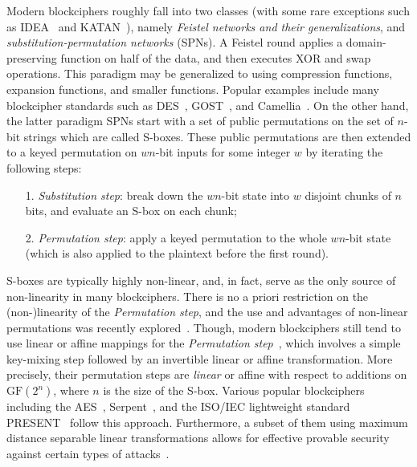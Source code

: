 \documentclass[journal=tosc,final,nohyperref]{iacrtrans}
\begin{document}
Modern blockciphers roughly fall into two classes (with some rare exceptions such as IDEA~\cite{EC:LaiMas90} and KATAN~\cite{CHES:DeCDunKne09}), namely {\it Feistel networks and their generalizations}, and {\it substitution-permutation networks} (SPNs). A Feistel round applies a domain-preserving function on half of the data, and then executes XOR and swap operations. This paradigm may be generalized to using compression functions, expansion functions, and smaller functions. Popular examples include many blockcipher standards such as DES~\cite{DESDesign}, GOST~\cite{GOSTDesign}, and Camellia~\cite{ISOIEC-18033-3:2010}. On the other hand, the latter paradigm SPNs start with a set of public permutations on the set of $n$-bit strings which are called S-boxes. These public permutations are then extended to a keyed permutation on $wn$-bit inputs for some integer $w$ by iterating the following steps:
\begin{enumerate}
	\item[1.] {\it Substitution step}: break down the $wn$-bit state into $w$ disjoint chunks of $n$ bits, and evaluate an S-box on each chunk;
	\item[2.] {\it Permutation step}: apply a keyed permutation to the whole $wn$-bit state (which is also applied to the plaintext before the first round).
\end{enumerate}
%
S-boxes are typically highly non-linear, and, in fact, serve as the only source of non-linearity in many blockciphers. There is no a priori restriction on the (non-)linearity of the {\it Permutation step}, and the use and advantages of non-linear permutations was recently explored~\cite{DBLP:journals/dcc/LiuRL18}. Though, modern blockciphers still tend to use linear or affine mappings for the {\it Permutation step}~\cite{DBLP:reference/crypt/Biryukov11aa}, which involves a simple key-mixing step followed
by an invertible linear or affine transformation. More precisely, their permutation steps are {\it linear} or affine with respect to additions on $\text{GF}(2^n)$, where $n$ is the size of the S-box. Various popular blockciphers including the AES~\cite{AESDesign}, Serpent~\cite{serpentProposal}, and the ISO/IEC lightweight standard PRESENT~\cite{CHES:BKLPPR07} follow this approach. Furthermore, a subset of them using maximum distance separable linear transformations allows for effective provable security against certain types of attacks~\cite{IMA:DaeRij01,AC:PSCYL02,FSE:PSLL03,miles2015substitution,EC:SLGRL16}.
\end{document}
